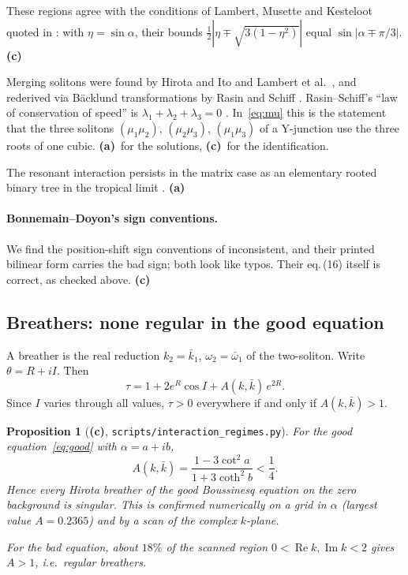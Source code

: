 \documentclass[11pt,a4paper]{article}
\newcommand{\La}{\textsf{\textbf{(a)}}}
\newcommand{\Lc}{\textsf{\textbf{(c)}}}
\newcommand{\script}[1]{\texttt{scripts/#1}}
\newtheorem{proposition}{Proposition}[section]
\theoremstyle{remark}
\begin{document}
These regions agree with the conditions of Lambert, Musette and Kesteloot quoted in \cite[(29)--(33)]{BD}: with $\eta=\sin\alpha$, their bounds $\tfrac12|\eta\mp\sqrt{3(1-\eta^2)}|$ equal $\sin|\alpha\mp\pi/3|$. \Lc

Merging solitons were found by Hirota and Ito \cite{HI} and Lambert et al.\ \cite{LMK}, and rederived via Bäcklund transformations by Rasin and Schiff \cite{RS}. Rasin--Schiff's ``law of conservation of speed'' is $\lambda_1+\lambda_2+\lambda_3=0$ \cite[§3]{RS}. In~\eqref{eq:mu} this is the statement that the three solitons $(\mu_1\mu_2)$, $(\mu_2\mu_3)$, $(\mu_1\mu_3)$ of a Y-junction use the three roots of one cubic. \La\ for the solutions, \Lc\ for the identification.

The resonant interaction persists in the matrix case as an elementary rooted binary tree in the tropical limit \cite[Remark 3.4]{DMHC}. \La

\paragraph{Bonnemain--Doyon's sign conventions.} We find the position-shift sign conventions of \cite[(22) vs (24)]{BD} inconsistent, and their printed bilinear form \cite[(12)]{BD} carries the bad sign; both look like typos. Their eq.\,(16) itself is correct, as checked above. \Lc

\subsection{Breathers: none regular in the good equation}\label{sec:breathers}

A breather is the real reduction $k_2=\bar k_1$, $\omega_2=\bar\omega_1$ of the two-soliton. Write $\theta=R+iI$. Then
\[
\tau=1+2e^{R}\cos I+A(k,\bar k)\,e^{2R}.
\]
Since $I$ varies through all values, $\tau>0$ everywhere if and only if $A(k,\bar k)>1$.

\begin{proposition}[\Lc, \script{interaction\_regimes.py}]\label{prop:nobreather}
For the good equation~\eqref{eq:good} with $\alpha=a+ib$,
\[
A(k,\bar k)=\frac{1-3\cot^2a}{1+3\coth^2b}<\frac14 .
\]
Hence \emph{every Hirota breather of the good Boussinesq equation on the zero background is singular}. This is confirmed numerically on a grid in $\alpha$ (largest value $A=0.2365$) and by a scan of the complex $k$-plane.

For the bad equation, about $18\%$ of the scanned region $0<\operatorname{Re}k,\operatorname{Im}k<2$ gives $A>1$, i.e.\ regular breathers.
\end{proposition}
\end{document}
